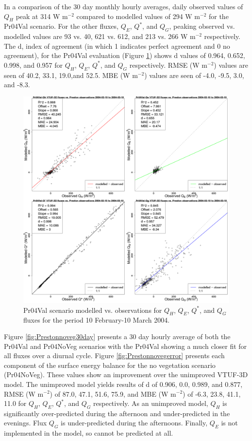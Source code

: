 \documentclass[final,3p,times,authoryear]{elsarticle}
\begin{document}
In a comparison of the 30 day monthly hourly averages, daily observed values of $Q_{H}$ peak at 314 W m$^{-2}$ compared to modelled values of 294 W m$^{-2}$ for the Pr04Val scenario. For the other fluxes, $Q_{E}$, $Q^{*}$, and $Q_{G}$, peaking observed vs. modelled values are 93 vs. 40, 621 vs. 612, and 213 vs. 266 W m$^{-2}$ respectively. The d, index of agreement (in which 1 indicates perfect agreement and 0 no agreement), for the Pr04Val evaluation (Figure \ref{fig:Preston6error}) shows d values of 0.964, 0.652, 0.998, and 0.957 for $Q_{H}$, $Q_{E}$, $Q^{*}$, and $Q_{G}$ respectively. RMSE (W m$^{-2}$) values are seen of 40.2, 33.1, 19.0,and 52.5. MBE (W m$^{-2}$) values are seen of -4.0, -9.5, 3.0, and -8.3. 

\begin{figure}[!htbp]
\includegraphics[trim = 0mm 0mm 0mm 0mm, clip, scale=0.30]{images/Pr04Val-ErrorPlots.png}
\caption{Pr04Val scenario modelled vs. observations for $Q_{H}$, $Q_{E}$, $Q^{*}$, and $Q_{G}$ fluxes for the period 10 February-10 March 2004. \label{fig:Preston6error}}   
\end{figure}

Figure \ref{fig:Prestonnoveg30day} presents a 30 day hourly average of both the Pr04Val and Pr04NoVeg scenarios with the Pr04Val showing a much closer fit for all fluxes over a diurnal cycle. Figure \ref{fig:Prestonnovegerror} presents each component of the surface energy balance for the no vegetation scenario (Pr04NoVeg). These values show an improvement over the unimproved VTUF-3D model. The unimproved model yields results of d of 0.906, 0.0, 0.989, and 0.877, RMSE (W m$^{-2}$) of 87.0, 47.1, 51.6, 75.9, and MBE (W m$^{-2}$) of -6.3, 23.8, 41.1, 11.0 for $Q_{H}$, $Q_{E}$, $Q^{*}$, and $Q_{G}$ respectively. As an unimproved model, $Q_{H}$ is significantly over-predicted during the afternoon and under-predicted in the evenings. Flux $Q_{G}$ is under-predicted during the afternoons. Finally, $Q_{E}$ is not implemented in the model, so cannot be predicted at all. 
\end{document}
